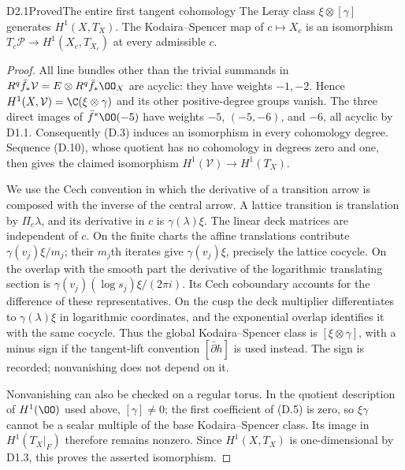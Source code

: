 \begin{claim}{D2.1}{Proved}{The entire first tangent cohomology}
The Leray class $\xi\otimes[\gamma]$ generates $H^1(X,T_X)$.
The Kodaira--Spencer map of $c\mapsto X_c$ is an isomorphism
$T_c\mathcal P\to H^1(X_c,T_{X_c})$ at every admissible $c$.
\end{claim}
\begin{proof}
All line bundles other than the trivial summands in
$R^q\bar f_*\mathcal V=E\otimes R^q\bar f_*\OO_X$ are acyclic:
they have weights $-1,-2$. Hence $H^1(X,\mathcal V)=
\C(\xi\otimes\gamma)$ and its other positive-degree groups vanish.
The three direct images of $\bar f^*\OO(-5)$ have weights
$-5$, $(-5,-6)$, and $-6$, all acyclic by D1.1. Consequently (D.3)
induces an isomorphism in every cohomology degree. Sequence (D.10),
whose quotient has no cohomology in degrees zero and one, then gives
the claimed isomorphism $H^1(\mathcal V)\to H^1(T_X)$.

We use the Cech convention in which the derivative of a transition
arrow is composed with the inverse of the central arrow. A lattice
transition is translation by $\Pi_c\lambda$, and its derivative in
$c$ is $\gamma(\lambda)\xi$. The linear deck matrices are independent
of $c$. On the finite charts the affine translations contribute
$\gamma(v_j)\xi/m_j$; their $m_j$th iterates give
$\gamma(v_j)\xi$, precisely the lattice cocycle. On the overlap with
the smooth part the derivative of the logarithmic translating section
is $\gamma(v_j)(\log s_j)\xi/(2\pi i)$. Its Cech coboundary accounts
for the difference of these representatives. On the cusp the deck
multiplier differentiates to $\gamma(\lambda)\xi$ in logarithmic
coordinates, and the exponential overlap identifies it with the same
cocycle. Thus the global Kodaira--Spencer class is
$[\xi\otimes\gamma]$, with a minus sign if the tangent-lift convention
$[\bar\partial h]$ is used instead. The sign is recorded; nonvanishing
does not depend on it.

Nonvanishing can also be checked on a regular torus. In the quotient
description of $H^1(\OO)$ used above, $[\gamma]\ne0$; the first
coefficient of (D.5) is zero, so $\xi\gamma$ cannot be a scalar
multiple of the base Kodaira--Spencer class. Its image in
$H^1(T_X|_F)$ therefore remains nonzero. Since $H^1(X,T_X)$ is
one-dimensional by D1.3, this proves the asserted isomorphism.
\end{proof}
